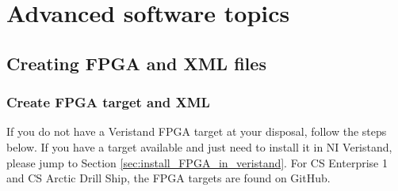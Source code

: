 \appendix
\chapter{Advanced software topics}
\section{Creating FPGA and XML files}
\subsection{Create FPGA target and XML}\label{subsec:Create-FPGA-target}
If you do not have a Veristand FPGA target at your disposal, follow the steps below. If you have a target available and just need to install it in NI Veristand, please jump to Section \ref{sec:install_FPGA_in_veristand}. For CS Enterprise 1 and CS Arctic Drill Ship, the FPGA targets are found on GitHub. 
